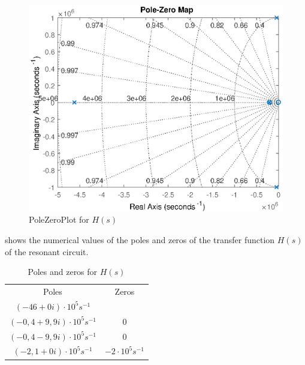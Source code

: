 \begin{figure}[H]
    \centering
    \includegraphics[width=\textwidth]{img/CoilRigPoleZeroPlot.eps}
    \caption{PoleZeroPlot for $H(s)$}
    \label{fig:polezero}
\end{figure}

 shows the numerical values of the poles and zeros of the transfer function $H(s)$ of the resonant circuit.

\begin{table}[H]
    \centering
    \begin{tabular}{c|c}
        Poles & Zeros \\
        $(-46 + 0i)   \cdot 10^{5} s^{-1}$ & \\
        $(-0,4 + 9,9i)\cdot 10^{5} s^{-1}$ & $0$ \\
        $(-0,4 - 9,9i)\cdot 10^{5} s^{-1}$ & $0$ \\
        $(-2,1 + 0i)  \cdot 10^{5} s^{-1}$ & $-2\cdot 10^{5} s^{-1}$ \\
    \end{tabular}
    \caption{Poles and zeros for $H(s)$}
    \label{tab:coilrigpoles}
\end{table}

